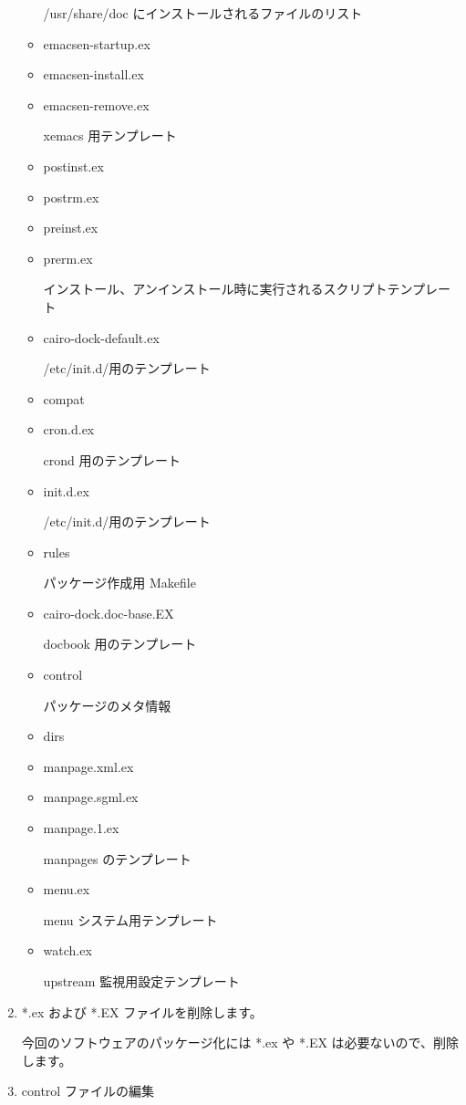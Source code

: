 \documentclass[mingoth,a4paper]{jsarticle}
\begin{document}
\begin{enumerate}
\begin{itemize}
				/usr/share/doc にインストールされるファイルのリスト
			\item emacsen-startup.ex
			\item emacsen-install.ex
			\item emacsen-remove.ex
       
 				xemacs 用テンプレート
			\item postinst.ex
			\item postrm.ex
			\item preinst.ex         
			\item prerm.ex

				インストール、アンインストール時に実行されるスクリプトテンプレート
			\item cairo-dock-default.ex
  
				/etc/init.d/用のテンプレート

			\item compat     
			\item cron.d.ex
  
				crond 用のテンプレート
			\item init.d.ex
           
				/etc/init.d/用のテンプレート
			\item rules

				パッケージ作成用 Makefile
			\item cairo-dock.doc-base.EX  

				docbook 用のテンプレート
			\item control
    
				パッケージのメタ情報
			\item dirs
			\item manpage.xml.ex 
			\item manpage.sgml.ex       
			\item manpage.1.ex
        
				manpages のテンプレート
			\item menu.ex
          
				menu システム用テンプレート
			\item watch.ex

				upstream 監視用設定テンプレート
		\end{itemize}
		
		
	\item *.ex および *.EX ファイルを削除します。

		今回のソフトウェアのパッケージ化には *.ex や *.EX は必要ないので、削除します。
 
	\item control ファイルの編集


\end{enumerate}
\end{document}
